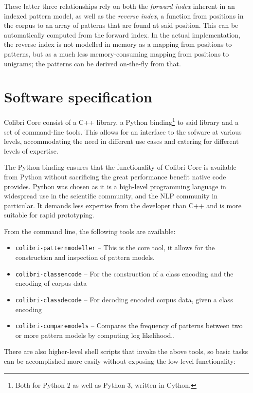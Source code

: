 \documentclass[review]{elsarticle}
\begin{document}
These latter three relationships rely on both the \emph{forward index} inherent
in an indexed pattern model, as well as the \emph{reverse index}, a function
from positions in the corpus to an array of patterns that are found at said
position. This can be automatically computed from the forward index. In the
actual implementation, the reverse index is not modelled in memory as a mapping from
positions to patterns, but as a much less memory-consuming mapping from
positions to unigrams; the patterns can be derived on-the-fly from that.

\section{Software specification}

Colibri Core consist of a C++ library, a Python binding\footnote{Both for
Python 2 as well as Python 3, written in Cython.} to said library and a set of
command-line tools. This allows for an interface to the sofware at various
levels, accommodating the need in different use cases and catering for
different levels of expertise. 

The Python binding ensures that the functionality of Colibri Core is available
from Python without sacrificing the great performance benefit native code
provides. Python was chosen as it is a high-level programming language in
widespread use in the scientific community, and the NLP community in
particular. It demands less expertise from the developer than C++ and is more
suitable for rapid prototyping.

From the command line, the following tools are available:

\begin{itemize}
    \item \texttt{colibri-patternmodeller} -- This is the core tool, it allows for the
        construction and inspection of pattern models.
    \item \texttt{colibri-classencode} -- For the construction of a class encoding and
        the encoding of corpus data
    \item \texttt{colibri-classdecode} -- For decoding encoded corpus data, given a class
        encoding
    \item \texttt{colibri-comparemodels} -- Compares the frequency of patterns between
        two or more pattern models by computing log likelihood,.
\end{itemize}

There are also higher-level shell scripts that invoke the above tools, so basic
tasks can be accomplished more easily without exposing the low-level functionality:
\end{document}
